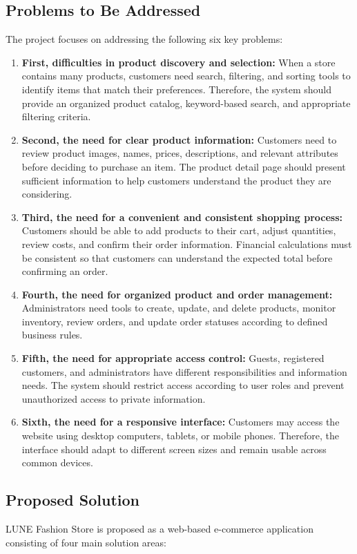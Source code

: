 \documentclass[12pt,a4paper,oneside]{report}
\begin{document}
\subsection{Problems to Be Addressed}
The project focuses on addressing the following six key problems:
\begin{enumerate}[leftmargin=1.2cm]
    \item \textbf{First, difficulties in product discovery and selection:} When a store contains many products, customers need search, filtering, and sorting tools to identify items that match their preferences. Therefore, the system should provide an organized product catalog, keyword-based search, and appropriate filtering criteria.
    \item \textbf{Second, the need for clear product information:} Customers need to review product images, names, prices, descriptions, and relevant attributes before deciding to purchase an item. The product detail page should present sufficient information to help customers understand the product they are considering.
    \item \textbf{Third, the need for a convenient and consistent shopping process:} Customers should be able to add products to their cart, adjust quantities, review costs, and confirm their order information. Financial calculations must be consistent so that customers can understand the expected total before confirming an order.
    \item \textbf{Fourth, the need for organized product and order management:} Administrators need tools to create, update, and delete products, monitor inventory, review orders, and update order statuses according to defined business rules.
    \item \textbf{Fifth, the need for appropriate access control:} Guests, registered customers, and administrators have different responsibilities and information needs. The system should restrict access according to user roles and prevent unauthorized access to private information.
    \item \textbf{Sixth, the need for a responsive interface:} Customers may access the website using desktop computers, tablets, or mobile phones. Therefore, the interface should adapt to different screen sizes and remain usable across common devices.
\end{enumerate}

\subsection{Proposed Solution}
LUNE Fashion Store is proposed as a web-based e-commerce application consisting of four main solution areas:
\end{document}
